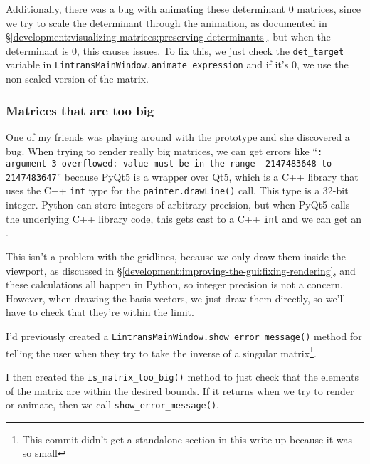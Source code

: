 \documentclass[../development.tex]{subfiles}
\begin{document}
Additionally, there was a bug with animating these determinant 0 matrices, since we try to scale the determinant through the animation, as documented in \S\ref{development:visualizing-matrices:preserving-determinants}, but when the determinant is 0, this causes issues. To fix this, we just check the \texttt{det\_target} variable in \texttt{LintransMainWindow.animate\_expression} and if it's 0, we use the non-scaled version of the matrix.


\subsubsection{Matrices that are too big\label{development:improving-the-gui:matrices-that-are-too-big}}

One of my friends was playing around with the prototype and she discovered a bug. When trying to render really big matrices, we can get errors like \enquote{\texttt{: argument 3 overflowed: value must be in the range -2147483648 to 2147483647}} because PyQt5 is a wrapper over Qt5, which is a C++ library that uses the C++ \texttt{int} type for the \texttt{painter.drawLine()} call. This type is a 32-bit integer. Python can store integers of arbitrary precision, but when PyQt5 calls the underlying C++ library code, this gets cast to a C++ \texttt{int} and we can get an .

This isn't a problem with the gridlines, because we only draw them inside the viewport, as discussed in \S\ref{development:improving-the-gui:fixing-rendering}, and these calculations all happen in Python, so integer precision is not a concern. However, when drawing the basis vectors, we just draw them directly, so we'll have to check that they're within the limit.

I'd previously created a \texttt{LintransMainWindow.show\_error\_message()} method for telling the user when they try to take the inverse of a singular matrix\footnote{This commit didn't get a standalone section in this write-up because it was so small}.


I then created the \texttt{is\_matrix\_too\_big()} method to just check that the elements of the matrix are within the desired bounds. If it returns  when we try to render or animate, then we call \texttt{show\_error\_message()}.
\end{document}
